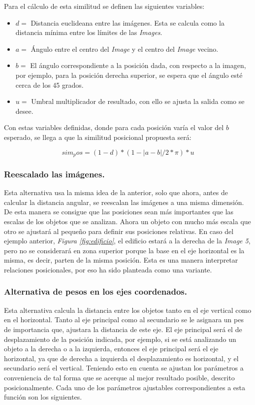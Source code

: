 Para el c\'alculo de esta similitud se definen las siguientes variables:
\begin{itemize}
    \item $d =$ Distancia euclideana entre las im\'agenes. Esta se calcula como la distancia m\'inima entre los l\'imites de las \textit{Images}.

    \item $a =$ \'Angulo entre el centro del \textit{Image} y el centro del \textit{Image} vecino.

    \item $b =$  El ángulo correspondiente a la posición dada, con respecto a la imagen, por ejemplo, para la posición derecha superior, se espera que el ángulo esté cerca de los 45 grados.

    \item $u =$  Umbral multiplicador de resultado, con ello se ajusta la salida como se desee.
\end{itemize}
Con estas variables definidas, donde para cada posici\'on var\'ia el valor del $b$ esperado, se llega a que la similitud posicional propuesta ser\'a:

\[sim_pos = (1-d)*(1- |a-b|/2*\pi) * u \]

\subsubsection{Reescalado las imágenes.}

Esta alternativa usa la misma idea de la anterior, solo que ahora, antes de calcular la distancia angular, se reescalan las imágenes a una misma dimensión. De esta manera se consigue que las posiciones sean más importantes que las escalas de los objetos que se analizan. Ahora un objeto con mucho más escala que otro se ajustará al pequeño para definir sus posiciones relativas. En caso del ejemplo anterior, \textit{Figura \ref{fig:edificio}}, el edificio estar\'a a la derecha de la \textit{Image 5}, pero no se considerar\'a en zona superior porque la base en el eje horizontal es la misma, es decir, parten de la misma posici\'on. Esta es una manera interpretar relaciones posicionales, por eso ha sido planteada como una variante.

\subsubsection{Alternativa de pesos en los ejes coordenados.}

Esta alternativa calcula la distancia entre los objetos tanto en el eje vertical como en el horizontal. Tanto al eje principal como al secundario se le asignara un pes de importancia que, ajustara la distancia de este eje. El eje principal ser\'a el de desplazamiento de la posici\'on indicada, por ejemplo, si se está analizando un objeto a la derecha o a la izquierda, entonces el eje principal será el eje horizontal, ya que de derecha a izquierda el desplazamiento es horizontal, y el secundario será el vertical. Teniendo esto en cuenta se ajustan los parámetros a conveniencia de tal forma que se acerque al mejor resultado posible, descrito posicionalmente. Cada uno de los parámetros ajustables correspondientes a esta función son los siguientes.

